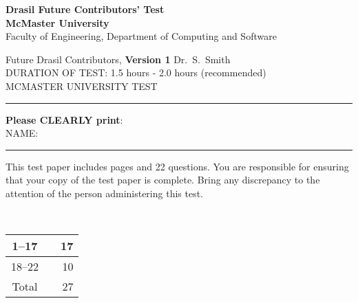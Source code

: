 \documentclass[12pt,fleqn]{examtst}
\begin{document}
\newcommand{\soln}{y} %


\newcommand{\codeit}[1]{\texttt{\textit{#1}}}

\begin{center}
  {\large \bf Drasil Future Contributors' Test}\\[1ex]
  {\large \bf McMaster University}\\[1ex]
  {\large Faculty of Engineering, Department of Computing and Software}
\end{center}

\medskip

\noindent
Future Drasil Contributors, \textbf{Version 1}  \hfill Dr.~S.~Smith \\
DURATION OF TEST: 1.5 hours - 2.0 hours (recommended) \\
MCMASTER UNIVERSITY TEST \hfill

\medskip

\noindent
\rule[3 mm]{\textwidth}{0.5mm}

\begin{minipage}[t]{1.0\textwidth}
\textbf{Please CLEARLY print}:\\[2mm]

NAME:\\[1ex]

\newsavebox{\bb}\newsavebox{\bbb}
\sbox{\bb}{\framebox[1cm]{\rule{0mm}{7mm}}}
\sbox{\bbb}{\usebox{\bb}\usebox{\bb}\usebox{\bb}\usebox{\bb}\usebox{\bb}\usebox{\bb}\usebox{\bb}\usebox{\bb}\usebox{\bb}}

\rule[3 mm]{\textwidth}{0.5mm}

This test paper includes \noofpages pages and 22 %
questions. You are responsible for ensuring that your copy of the 
test paper is complete. Bring any discrepancy to the attention of 
the person administering this test.\\

\end{minipage}\\

\hspace{14cm}
\begin{minipage}[t]{0.2\textwidth}
\newcommand{\markheight}{\rule[-2mm]{0 mm}{7 mm}}
\begin{tabular}[t]{|c|p{1.5 cm}|r|}
\hline
1--17 & \markheight & 17\\
\hline
18--22 & \markheight & 10\\

\hline
Total & \markheight & 27 \\
\hline

\end{tabular}
\end{minipage}
\end{document}
